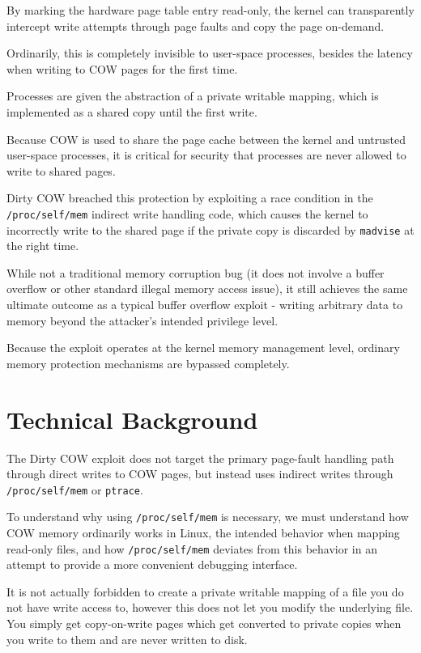 \documentclass[a4paper,10pt,twocolumn,english]{article}
\newcommand{\code}[1]{\texttt{#1}}
\begin{document}
By marking the hardware page table entry read-only, the kernel can transparently intercept write attempts through page faults and copy the page on-demand.

Ordinarily, this is completely invisible to user-space processes, besides the latency when writing to COW pages for the first time.

Processes are given the abstraction of a private writable mapping, which is implemented as a shared copy until the first write.

Because COW is used to share the page cache between the kernel and untrusted user-space processes, it is critical for security that processes are never allowed to write to shared pages.

Dirty COW breached this protection by exploiting a race condition in the \code{/proc/self/mem} indirect write handling code,
which causes the kernel to incorrectly write to the shared page if the private copy is discarded by \code{madvise} at the right time.

While not a traditional memory corruption bug (it does not involve a buffer overflow or other standard illegal memory access issue),
it still achieves the same ultimate outcome as a typical buffer overflow exploit - writing arbitrary data to memory beyond the attacker's intended privilege level.

Because the exploit operates at the kernel memory management level, ordinary memory protection mechanisms are bypassed completely.


\section{Technical Background}

The Dirty COW exploit does not target the primary page-fault handling path through direct writes to COW pages,
but instead uses indirect writes through \code{/proc/self/mem} or \code{ptrace}.

To understand why using \code{/proc/self/mem} is necessary, we must understand how COW memory ordinarily works in Linux,
the intended behavior when mapping read-only files, and how \code{/proc/self/mem} deviates from this behavior
in an attempt to provide a more convenient debugging interface.

It is not actually forbidden to create a private writable mapping of a file you do not have write access to,
however this does not let you modify the underlying file.
You simply get copy-on-write pages which get converted to private copies when you write to them
and are never written to disk.
\end{document}

